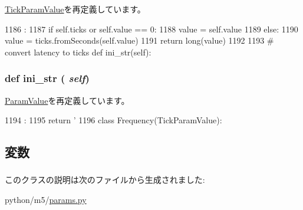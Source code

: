 \hyperlink{classm5_1_1params_1_1TickParamValue_acc340fbd4335fa34f9d57fb454b28ed0}{TickParamValue}を再定義しています。


\begin{DoxyCode}
1186                       :
1187         if self.ticks or self.value == 0:
1188             value = self.value
1189         else:
1190             value = ticks.fromSeconds(self.value)
1191         return long(value)
1192 
1193     # convert latency to ticks
    def ini_str(self):
\end{DoxyCode}
\hypertarget{classm5_1_1params_1_1Latency_a33ebe6cd32bcbd15465fc28b9d94bf82}{
\subsubsection[{ini\_\-str}]{\setlength{\rightskip}{0pt plus 5cm}def ini\_\-str ( {\em self})}}
\label{classm5_1_1params_1_1Latency_a33ebe6cd32bcbd15465fc28b9d94bf82}


\hyperlink{classm5_1_1params_1_1ParamValue_a33ebe6cd32bcbd15465fc28b9d94bf82}{ParamValue}を再定義しています。


\begin{DoxyCode}
1194                      :
1195         return '%
1196 
class Frequency(TickParamValue):
\end{DoxyCode}


\subsection{変数}
\hypertarget{classm5_1_1params_1_1Latency_a278a1f181e2be02613530daeaa8afdab}{
\subsubsection[{ticks}]{}}
\label{classm5_1_1params_1_1Latency_a278a1f181e2be02613530daeaa8afdab}
\hypertarget{classm5_1_1params_1_1Latency_afcc7a4b78ecd8fa7e713f8cfa0f51017}{
\subsubsection[{value}]{}}
\label{classm5_1_1params_1_1Latency_afcc7a4b78ecd8fa7e713f8cfa0f51017}


このクラスの説明は次のファイルから生成されました:\begin{DoxyCompactItemize}
\item 
python/m5/\hyperlink{params_8py}{params.py}\end{DoxyCompactItemize}
